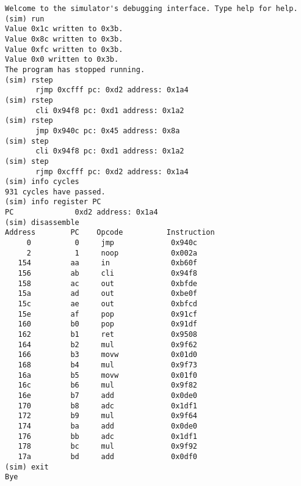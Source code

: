 

\begin{block}{\large {}\vphantom{Simulator Debugger}}

\tiny {  
\begin{lstlisting}
Welcome to the simulator's debugging interface. Type help for help. 
(sim) run
Value 0x1c written to 0x3b.
Value 0x8c written to 0x3b.
Value 0xfc written to 0x3b.
Value 0x0 written to 0x3b.
The program has stopped running.
(sim) rstep
       rjmp 0xcfff pc: 0xd2 address: 0x1a4
(sim) rstep
       cli 0x94f8 pc: 0xd1 address: 0x1a2
(sim) rstep
       jmp 0x940c pc: 0x45 address: 0x8a
(sim) step
       cli 0x94f8 pc: 0xd1 address: 0x1a2
(sim) step
       rjmp 0xcfff pc: 0xd2 address: 0x1a4
(sim) info cycles
931 cycles have passed.
(sim) info register PC
PC              0xd2 address: 0x1a4
(sim) disassemble
Address        PC    Opcode          Instruction    
     0          0     jmp             0x940c
     2          1     noop            0x002a
   154         aa     in              0xb60f
   156         ab     cli             0x94f8
   158         ac     out             0xbfde
   15a         ad     out             0xbe0f
   15c         ae     out             0xbfcd
   15e         af     pop             0x91cf
   160         b0     pop             0x91df
   162         b1     ret             0x9508
   164         b2     mul             0x9f62
   166         b3     movw            0x01d0
   168         b4     mul             0x9f73
   16a         b5     movw            0x01f0
   16c         b6     mul             0x9f82
   16e         b7     add             0x0de0
   170         b8     adc             0x1df1
   172         b9     mul             0x9f64
   174         ba     add             0x0de0
   176         bb     adc             0x1df1
   178         bc     mul             0x9f92
   17a         bd     add             0x0df0
(sim) exit
Bye  
\end{lstlisting}
}


\end{block}


